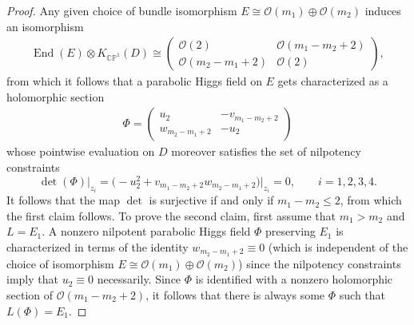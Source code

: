 \documentclass[pdftex]{sigma}
\newcommand{\field}[1]{\ensuremath{\mathbb{#1}}}
\newcommand{\CC}{\field{C}}
\newcommand{\PP}{\field{P}}
\newcommand{\calO}{\mathcal{O}}
\DeclareMathOperator{\End}{End}
\numberwithin{equation}{section}
\begin{document}
\begin{proof}
Any given choice of bundle isomorphism $E\cong \calO(m_{1})\oplus\calO(m_{2})$ induces an isomorphism
\begin{gather*}
\End(E)\otimes K_{\CC\PP^{1}}(D)\cong
\begin{pmatrix}
\calO(2) & \calO(m_{1}-m_{2}+2)\\
\calO(m_{2}-m_{1}+2) & \calO(2)
\end{pmatrix}\!,
\end{gather*}
from which it follows that a parabolic Higgs field on $E$ gets characterized as a holomorphic section
\begin{gather}\label{eq:Phi-1}
\Phi =
\begin{pmatrix}
u_{2} & -v_{m_{1}-m_{2}+2}\\
w_{m_{2}-m_{1}+2} & -u_{2}
\end{pmatrix}
\end{gather}
whose pointwise evaluation on $D$ moreover satisfies the set of nilpotency constraints
\[
\det(\Phi)\vert_{z_{i}} = \bigl({-}u_{2}^{2} + v_{m_{1}-m_{2}+2}w_{m_{2}-m_{1}+2}\bigr)\big\vert_{z_{i}}=0,\qquad i=1,2,3,4.
\]
It follows that the map $\det$ is surjective if and only if $m_{1}-m_{2}\leq 2$, from which the first claim follows. To prove the second claim, first assume that $m_{1} > m_{2}$ and $L=E_{1}$. A nonzero nilpotent parabolic Higgs field $\Phi$ preserving $E_{1}$ is characterized in terms of the identity $w_{m_{2}-m_{1}+2}\equiv 0$ (which is independent of the choice of isomorphism $E \cong \calO(m_{1})\oplus\calO(m_{2})$) since the nilpotency constraints imply that $u_{2}\equiv 0$ necessarily. Since $\Phi$ is identified with a nonzero holomorphic section of $\calO(m_{1}-m_{2}+2)$, it follows that there is always some $\Phi$ such that $L(\Phi)=E_{1}$.


\end{proof}
\end{document}
